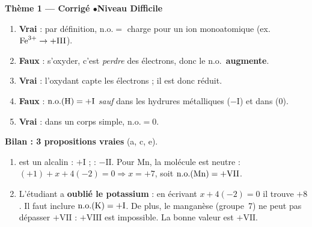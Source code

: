 \documentclass[11pt,a4paper]{article}
\begin{document}
\begin{center}\color{primarydark}\large\bfseries Thème 1 — Corrigé \quad$\bullet$\quad Niveau Difficile\end{center}

\begin{corrige}
\begin{enumerate}[label=\alph*)]
  \item \textbf{Vrai} : par définition, $\mathrm{n.o.}=$ charge pour un ion monoatomique
        (ex.\ $\ce{Fe^{3+}}\to +\mathrm{III}$).
  \item \textbf{Faux} : s'oxyder, c'est \emph{perdre} des électrons, donc le n.o.\ \textbf{augmente}.
  \item \textbf{Vrai} : l'oxydant capte les électrons ; il est donc réduit.
  \item \textbf{Faux} : $\mathrm{n.o.}(\ce{H})=+\mathrm{I}$ \emph{sauf} dans les hydrures métalliques
        ($-\mathrm{I}$) et dans  ($0$).
  \item \textbf{Vrai} : dans un corps simple, $\mathrm{n.o.}=0$.
\end{enumerate}
\textbf{Bilan : 3 propositions vraies} (a, c, e).
\end{corrige}

\begin{corrige}
\begin{enumerate}[label=\alph*)]
  \item {} est un alcalin : $+\mathrm{I}$ ;  : $-\mathrm{II}$. Pour Mn, la molécule est neutre :
        $(+1)+x+4(-2)=0\Rightarrow x=+7$, soit $\mathrm{n.o.}(\ce{Mn})=+\mathrm{VII}$.
  \item L'étudiant a \textbf{oublié le potassium} : en écrivant $x+4(-2)=0$ il trouve $+8$. Il faut
        inclure $\mathrm{n.o.}(\ce{K})=+\mathrm{I}$. De plus, le manganèse (groupe~7) ne peut pas
        dépasser $+\mathrm{VII}$ : $+\mathrm{VIII}$ est impossible. La bonne valeur est
        $+\mathrm{VII}$.
\end{enumerate}
\end{corrige}
\end{document}
